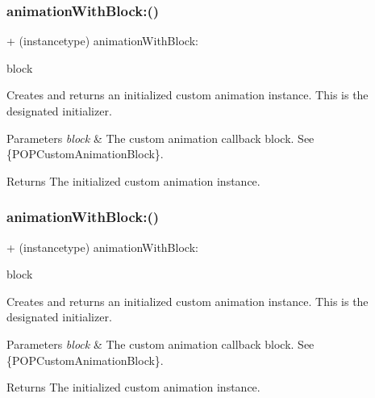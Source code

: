 \subsubsection{\texorpdfstring{animation\+With\+Block\+:()}{animationWithBlock:()}\hspace{0.1cm}{\footnotesize\ttfamily [1/3]}}
{\footnotesize\ttfamily + (instancetype) animation\+With\+Block\+: \begin{DoxyParamCaption}\item[{(P\+O\+P\+Custom\+Animation\+Block)}]{block }\end{DoxyParamCaption}}

Creates and returns an initialized custom animation instance.  This is the designated initializer. 
\begin{DoxyParams}{Parameters}
{\em block} & The custom animation callback block. See \{P\+O\+P\+Custom\+Animation\+Block\}. \\
\hline
\end{DoxyParams}
\begin{DoxyReturn}{Returns}
The initialized custom animation instance. 
\end{DoxyReturn}
\mbox{\label{interface_p_o_p_custom_animation_a29cfdbe36ee1a37a6e9a37eb934a13e1}} 
\subsubsection{\texorpdfstring{animation\+With\+Block\+:()}{animationWithBlock:()}\hspace{0.1cm}{\footnotesize\ttfamily [2/3]}}
{\footnotesize\ttfamily + (instancetype) animation\+With\+Block\+: \begin{DoxyParamCaption}\item[{(P\+O\+P\+Custom\+Animation\+Block)}]{block }\end{DoxyParamCaption}}

Creates and returns an initialized custom animation instance.  This is the designated initializer. 
\begin{DoxyParams}{Parameters}
{\em block} & The custom animation callback block. See \{P\+O\+P\+Custom\+Animation\+Block\}. \\
\hline
\end{DoxyParams}
\begin{DoxyReturn}{Returns}
The initialized custom animation instance. 
\end{DoxyReturn}
\mbox{\label{interface_p_o_p_custom_animation_a29cfdbe36ee1a37a6e9a37eb934a13e1}} 
